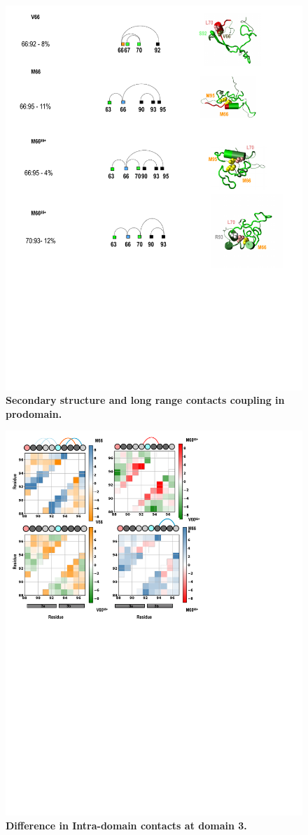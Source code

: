 \documentclass[10pt,letterpaper]{article}
\begin{document}
\begin{figure}[!ht]
\includegraphics[scale=0.5,width=12cm,trim={0 0cm 0 0cm},clip]{../figures/n3.pdf}
\caption{{\bf Secondary structure and long range contacts coupling in prodomain.}
 }
\label{fig6}
\end{figure}

\begin{figure}[!ht]
\includegraphics[scale=0.5,width=12cm,trim={0 0cm 0 0cm},clip]{../figures/3a_3b.pdf}
\caption{{\bf Difference in Intra-domain contacts at domain 3.}
 }
\label{fig6}
\end{figure}
\end{document}
